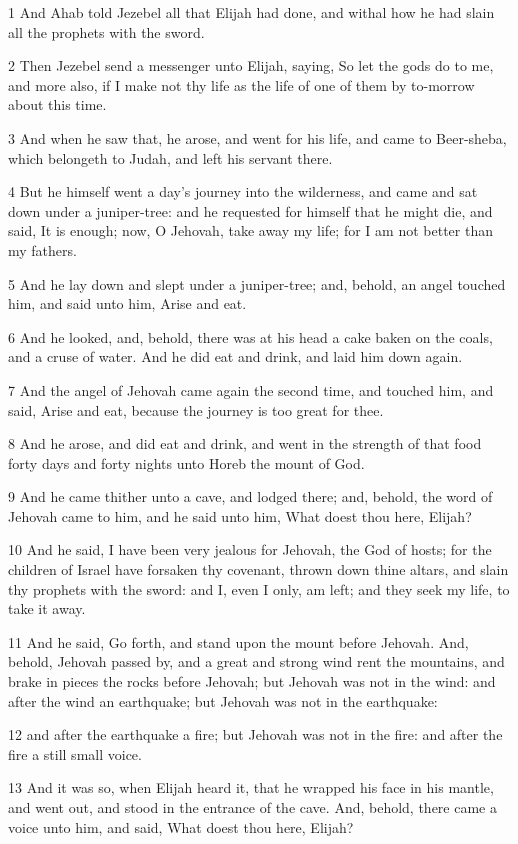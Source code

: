 \par 1 And Ahab told Jezebel all that Elijah had done, and withal how he had slain all the prophets with the sword.
\par 2 Then Jezebel send a messenger unto Elijah, saying, So let the gods do to me, and more also, if I make not thy life as the life of one of them by to-morrow about this time.
\par 3 And when he saw that, he arose, and went for his life, and came to Beer-sheba, which belongeth to Judah, and left his servant there.
\par 4 But he himself went a day's journey into the wilderness, and came and sat down under a juniper-tree: and he requested for himself that he might die, and said, It is enough; now, O Jehovah, take away my life; for I am not better than my fathers.
\par 5 And he lay down and slept under a juniper-tree; and, behold, an angel touched him, and said unto him, Arise and eat.
\par 6 And he looked, and, behold, there was at his head a cake baken on the coals, and a cruse of water. And he did eat and drink, and laid him down again.
\par 7 And the angel of Jehovah came again the second time, and touched him, and said, Arise and eat, because the journey is too great for thee.
\par 8 And he arose, and did eat and drink, and went in the strength of that food forty days and forty nights unto Horeb the mount of God.
\par 9 And he came thither unto a cave, and lodged there; and, behold, the word of Jehovah came to him, and he said unto him, What doest thou here, Elijah?
\par 10 And he said, I have been very jealous for Jehovah, the God of hosts; for the children of Israel have forsaken thy covenant, thrown down thine altars, and slain thy prophets with the sword: and I, even I only, am left; and they seek my life, to take it away.
\par 11 And he said, Go forth, and stand upon the mount before Jehovah. And, behold, Jehovah passed by, and a great and strong wind rent the mountains, and brake in pieces the rocks before Jehovah; but Jehovah was not in the wind: and after the wind an earthquake; but Jehovah was not in the earthquake:
\par 12 and after the earthquake a fire; but Jehovah was not in the fire: and after the fire a still small voice.
\par 13 And it was so, when Elijah heard it, that he wrapped his face in his mantle, and went out, and stood in the entrance of the cave. And, behold, there came a voice unto him, and said, What doest thou here, Elijah?
